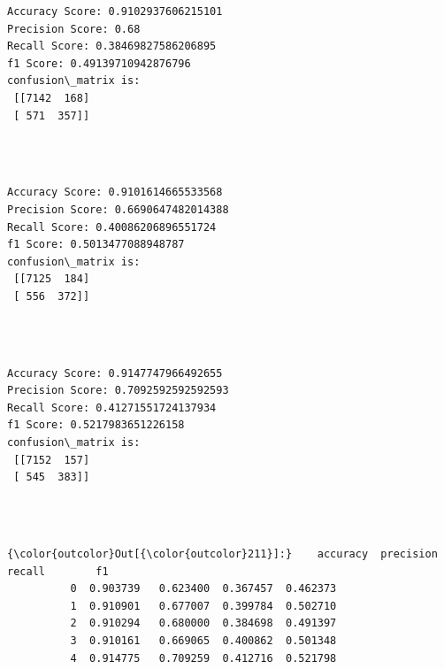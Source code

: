 \documentclass[11pt]{article}
\begin{document}
    \begin{Verbatim}[commandchars=\\\{\}]
Accuracy Score: 0.9102937606215101
Precision Score: 0.68
Recall Score: 0.38469827586206895
f1 Score: 0.49139710942876796
confusion\_matrix is: 
 [[7142  168]
 [ 571  357]] 


    \end{Verbatim}

   

    \begin{center}
    \end{center}
    { \hspace*{\fill} \\}
    
  

    \begin{Verbatim}[commandchars=\\\{\}]
Accuracy Score: 0.9101614665533568
Precision Score: 0.6690647482014388
Recall Score: 0.40086206896551724
f1 Score: 0.5013477088948787
confusion\_matrix is: 
 [[7125  184]
 [ 556  372]] 


    \end{Verbatim}

   

    \begin{center}
    \end{center}
    { \hspace*{\fill} \\}
    
   

    \begin{Verbatim}[commandchars=\\\{\}]
Accuracy Score: 0.9147747966492655
Precision Score: 0.7092592592592593
Recall Score: 0.41271551724137934
f1 Score: 0.5217983651226158
confusion\_matrix is: 
 [[7152  157]
 [ 545  383]] 


    \end{Verbatim}

   

    \begin{center}
    \end{center}
    { \hspace*{\fill} \\}
    
\begin{Verbatim}[commandchars=\\\{\}]
{\color{outcolor}Out[{\color{outcolor}211}]:}    accuracy  precision    recall        f1
          0  0.903739   0.623400  0.367457  0.462373
          1  0.910901   0.677007  0.399784  0.502710
          2  0.910294   0.680000  0.384698  0.491397
          3  0.910161   0.669065  0.400862  0.501348
          4  0.914775   0.709259  0.412716  0.521798
\end{Verbatim}
            
\end{document}
